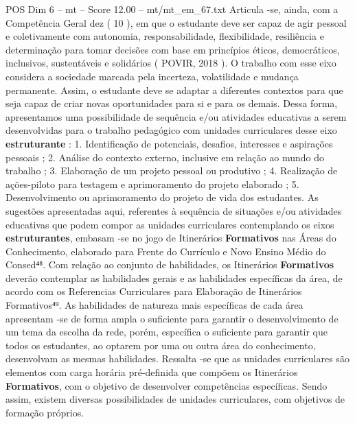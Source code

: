 \begin{textsample}{POS Dim 6 – mt – Score 12.00 – mt/mt\_em\_67.txt}
Articula -se, ainda, com a Competência Geral dez ( 10 ), em que o estudante deve ser capaz de agir pessoal e coletivamente com autonomia, responsabilidade, flexibilidade, resiliência e determinação para tomar decisões com base em princípios éticos, democráticos, inclusivos, sustentáveis e solidários ( POVIR, 2018 ).
O trabalho com esse eixo considera a sociedade marcada pela incerteza, volatilidade e mudança permanente.
Assim, o estudante deve se adaptar a diferentes contextos para que seja capaz de criar novas oportunidades para si e para os demais.
Dessa forma, apresentamos uma possibilidade de sequência e/ou atividades educativas a serem desenvolvidas para o trabalho pedagógico com unidades curriculares desse eixo \textbf{estruturante} : 1.
Identificação de potenciais, desafios, interesses e aspirações pessoais ; 2.
Análise do contexto externo, inclusive em relação ao mundo do trabalho ; 3.
Elaboração de um projeto pessoal ou produtivo ; 4.
Realização de ações-piloto para testagem e aprimoramento do projeto elaborado ; 5.
Desenvolvimento ou aprimoramento do projeto de vida dos estudantes.
As sugestões apresentadas aqui, referentes à sequência de situações e/ou atividades educativas que podem compor as unidades curriculares contemplando os eixos \textbf{estruturantes}, embasam -se no jogo de Itinerários \textbf{Formativos} nas Áreas do Conhecimento, elaborado para Frente do Currículo e Novo Ensino Médio do Consed⁴⁸.
Com relação ao conjunto de habilidades, os Itinerários \textbf{Formativos} deverão contemplar as habilidades gerais e as habilidades específicas da área, de acordo com os Referencias Curriculares para Elaboração de Itinerários Formativos⁴⁹.
As habilidades de natureza mais específicas de cada área apresentam -se de forma ampla o suficiente para garantir o desenvolvimento de um tema da escolha da rede, porém, específica o suficiente para garantir que todos os estudantes, ao optarem por uma ou outra área do conhecimento, desenvolvam as mesmas habilidades.
Ressalta -se que as unidades curriculares são elementos com carga horária pré-definida que compõem os Itinerários \textbf{Formativos}, com o objetivo de desenvolver competências específicas.
Sendo assim, existem diversas possibilidades de unidades curriculares, com objetivos de formação próprios.

\end{textsample}
